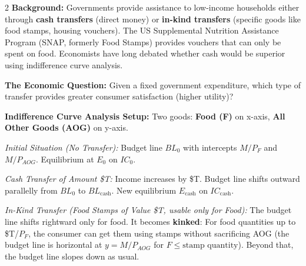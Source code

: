 \documentclass[10pt,a4paper]{article}
\begin{document}
\begin{multicols}{2}
\textbf{Background:} Governments provide assistance to low-income households either through \textbf{cash transfers} (direct money) or \textbf{in-kind transfers} (specific goods like food stamps, housing vouchers). The US Supplemental Nutrition Assistance Program (SNAP, formerly Food Stamps) provides vouchers that can only be spent on food. Economists have long debated whether cash would be superior using indifference curve analysis.

\textbf{The Economic Question:} Given a fixed government expenditure, which type of transfer provides greater consumer satisfaction (higher utility)?

\textbf{Indifference Curve Analysis Setup:}
Two goods: \textbf{Food (F)} on x-axis, \textbf{All Other Goods (AOG)} on y-axis.

\textit{Initial Situation (No Transfer):} Budget line $BL_0$ with intercepts $M/P_F$ and $M/P_{AOG}$. Equilibrium at $E_0$ on $IC_0$.

\textit{Cash Transfer of Amount \$T:} Income increases by \$T. Budget line shifts outward parallelly from $BL_0$ to $BL_{\text{cash}}$. New equilibrium $E_{\text{cash}}$ on $IC_{\text{cash}}$.

\textit{In-Kind Transfer (Food Stamps of Value \$T, usable only for Food):} The budget line shifts rightward only for food. It becomes \textbf{kinked}: For food quantities up to \$T/$P_F$, the consumer can get them using stamps without sacrificing AOG (the budget line is horizontal at $y = M/P_{AOG}$ for $F \leq \text{stamp quantity}$). Beyond that, the budget line slopes down as usual.

\begin{center}
\end{center}


\end{multicols}
\end{document}
